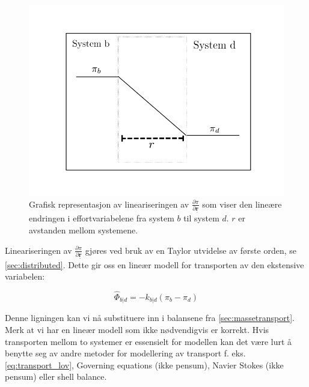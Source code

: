 \begin{figure}[H]
    \centering
    \includegraphics[scale=0.5]{Figures/linearized_transport.png}
    \caption{Grafisk representasjon av lineariseringen av $\frac{\partial \pi}{\partial \underline{\textbf{r}}}$  som viser den lineære endringen i effortvariabelene fra system $b$ til system $d$. $r$ er avstanden mellom systemene. }
    \label{fig:linearized_transport}
\end{figure}
Lineariseringen av $\frac{\partial \pi}{\partial \underline{\textbf{r}}}$ gjøres ved bruk av en Taylor utvidelse av første orden, se \cref{sec:distributed}. Dette gir oss en lineær modell for transporten av den ekstensive variabelen:



\begin{equation}
    \label{eq:transportlov_linear}
    \hat{\Phi}_{b|d} = -k_{b|d}(\pi_b-\pi_d)
\end{equation}

Denne ligningen kan vi nå substituere inn i balansene fra  \cref{sec:massetransport}. Merk at vi har en lineær modell som ikke nødvendigvis er korrekt. Hvis transporten mellom to systemer er essensielt for modellen kan det være lurt å benytte seg av andre metoder for modellering av transport f. eks. \cref{eq:transport_lov}, Governing equations (ikke pensum), Navier Stokes (ikke pensum) eller shell balance. 

